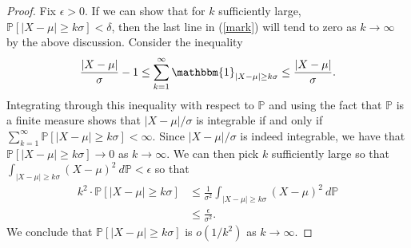 \documentclass[11pt,letterpaper]{report}
\newcommand{\Prob}{\mathbb{P}}
\newcommand{\ind}{\mathbbm{1}}
\begin{document}
\begin{enumerate}
\begin{enumerate}
\begin{proof}
			\noindent Fix $\epsilon>0$. If we can show that for $k$ sufficiently large, $\Prob[|X-\mu|\geq k\sigma]<\delta$, then the last line in (\ref{mark}) will tend to zero as $k\to \infty$ by the above discussion. Consider the inequality
			\[
			\frac{|X-\mu|}{\sigma}-1 \leq \sum_{k=1}^\infty\ind_{|X-\mu|\geq k\sigma} \leq \frac{|X-\mu|}{\sigma}.
			\]
			Integrating through this inequality with respect to $\Prob$ and using the fact that $\Prob$ is a finite measure shows that $|X-\mu|/\sigma$ is integrable if and only if $\sum_{k=1}^\infty\Prob[|X-\mu|\geq k\sigma]<\infty$. Since $|X-\mu|/\sigma$ is indeed integrable, we have that $\Prob[|X-\mu|\geq k\sigma]\to 0$ as $k\to \infty$. We can then pick $k$ sufficiently large so that $\int_{|X-\mu|\geq k\sigma}(X-\mu)^2\ d\Prob<\epsilon$ so that
			\begin{align*}
			k^2\cdot \Prob[|X-\mu|\geq k\sigma] &\leq \frac{1}{\sigma^2}\int_{|X-\mu|\geq k\sigma}(X-\mu)^2\ d\Prob\\
			&\leq \frac{\epsilon}{\sigma^2}.
			\end{align*}
			We conclude that $\Prob[|X-\mu|\geq k\sigma]$ is $o(1/k^2)$ as $k\to \infty$.
		\end{proof}
	\end{enumerate}
\end{enumerate}
\end{document}
